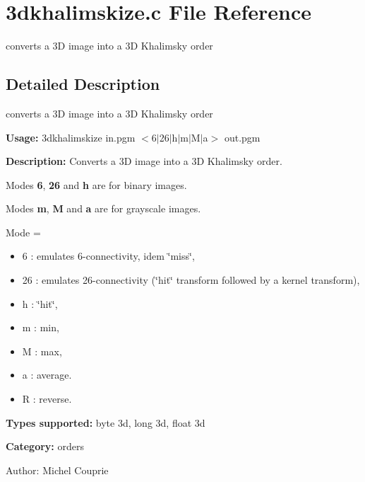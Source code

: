 \section{3dkhalimskize.c File Reference}
\label{3dkhalimskize_8c}
converts a 3D image into a 3D Khalimsky order  




\label{_details}
\subsection{Detailed Description}
converts a 3D image into a 3D Khalimsky order 

{\bf Usage:} 3dkhalimskize in.pgm $<$6$|$26$|$h$|$m$|$M$|$a$>$ out.pgm

{\bf Description:} Converts a 3D image into a 3D Khalimsky order.

Modes {\bf 6}, {\bf 26} and {\bf h} are for binary images.

Modes {\bf m}, {\bf M} and {\bf a} are for grayscale images.

Mode = \begin{itemize}
\item 6 : emulates 6-connectivity, idem \char`\"{}miss\char`\"{}, \item 26 : emulates 26-connectivity (\char`\"{}hit\char`\"{} transform followed by a kernel transform), \item h : \char`\"{}hit\char`\"{}, \item m : min, \item M : max, \item a : average. \item R : reverse.\end{itemize}
{\bf Types supported:} byte 3d, long 3d, float 3d

{\bf Category:} orders

\begin{Desc}
\item[Author:]Michel Couprie \end{Desc}
